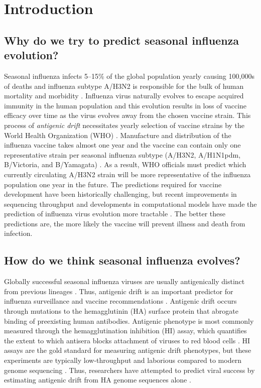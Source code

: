 \chapter {Introduction}

\section{Why do we try to predict seasonal influenza evolution?}

Seasonal influenza infects 5--15\% of the global population yearly causing 100,000s of deaths and influenza subtype A/H3N2 is responsible for the bulk of human mortality and morbidity \citep{WHO2009}.
Influenza virus naturally evolves to escape acquired immunity in the human population and this evolution results in loss of vaccine efficacy over time as the virus evolves away from the chosen vaccine strain.
This process of \textit{antigenic drift} necessitates yearly selection of vaccine strains by the World Health Organization (WHO) \citep{Smith:2004jc}.
Manufacture and distribution of the influenza vaccine takes almost one year and the vaccine can contain only one representative strain per seasonal influenza subtype (A/H3N2, A/H1N1pdm, B/Victoria, and B/Yamagata) \citep{Buckland2015}.
As a result, WHO officials must predict which currently circulating A/H3N2 strain will be more representative of the influenza population one year in the future.
The predictions required for vaccine development have been historically challenging, but recent improvements in sequencing throughput and developments in computational models have made the prediction of influenza virus evolution more tractable \citep{Lassig:2017hr,Morris:2017ea}.
The better these predictions are, the more likely the vaccine will prevent illness and death from infection.

\section{How do we think seasonal influenza evolves?}

Globally successful seasonal influenza viruses are usually antigenically distinct from previous lineages \citep{Smith:2004jc}.
Thus, antigenic drift is an important predictor for influenza surveillance and vaccine recommendations \citep{Morris:2017ea}.
Antigenic drift occurs through mutations to the hemagglutinin (HA) surface protein that abrogate binding of preexisting human antibodies.
Antigenic phenotype is most commonly measured through the hemagglutination inhibition (HI) assay, which quantifies the extent to which antisera blocks attachment of viruses to red blood cells \citep{hirst1943studies}.
HI assays are the gold standard for measuring antigenic drift phenotypes, but these experiments are typically low-throughput and laborious compared to modern genome sequencing \citep{Wood:2012ii}.
Thus, researchers have attempted to predict viral success by estimating antigenic drift from HA genome sequences alone \citep{Luksza:2014hj,Steinbruck:2014kq,Neher:2014eu}.

